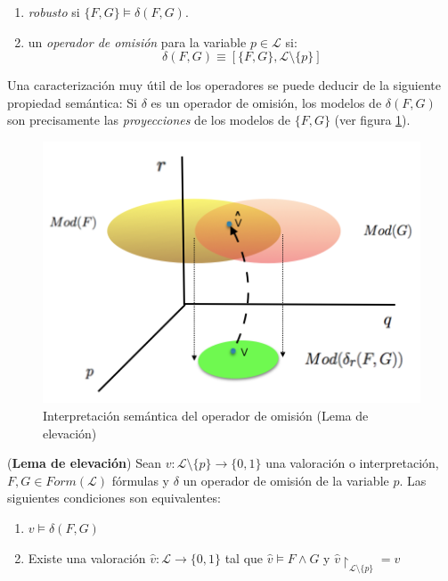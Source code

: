 \begin{enumerate}
\item \textit{robusto} si $\{F,G\} \vDash \delta (F,G)$.
\item un \textit{operador de omisión} para la variable $p \in \mathcal{L}$ si:
$$\delta (F,G) \equiv [\{F,G\}, \mathcal{L} \setminus \{p\}]$$
\end{enumerate} 

Una caracterización muy útil de los operadores se puede deducir de la siguiente propiedad semántica: Si  $\delta$ es un operador de omisión, los modelos de $\delta (F,G)$ son precisamente las \textit{proyecciones} de los modelos de $\{ F,G \}$ (ver figura \ref{fig:proy}). 

\vspace{0.5cm}
\begin{figure}[h]
	\centering
		\includegraphics[scale=0.6]{imagenes/indemod.png}
	\caption{Interpretación semántica del operador de omisión (Lema de elevación)}
	\label{fig:proy}
\end{figure}
\vspace{0.5cm}

\lem \label{lem:lifting} (\textbf{Lema de elevación}) Sean $v :\mathcal{L} \setminus \{p\} \rightarrow \{ 0,1 \}$ una valoración o interpretación, $F, G \in Form(\mathcal{L})$ fórmulas y $\delta$ un operador de omisión de la variable $p$. Las siguientes condiciones son equivalentes:
\begin{enumerate}
\item $v \vDash \delta (F,G)$
\item Existe una valoración $\hat{v} : \mathcal{L} \rightarrow \{ 0,1 \}$ tal que $\hat{v} \vDash F \wedge G$ y $\hat{v} \upharpoonright_{\mathcal{L} \setminus \{ p \}} = v $
\end{enumerate}

